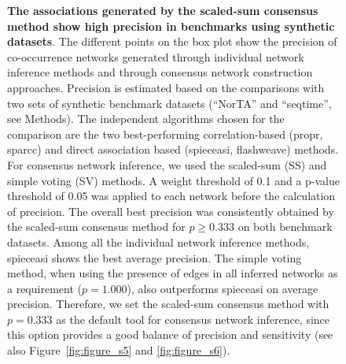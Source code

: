 \documentclass[letterpaper,12pt]{article}
\begin{document}
  \begin{figure}[H]
    \centering
    \caption{
      \textbf{The associations generated by the scaled-sum consensus method show high precision in benchmarks using synthetic datasets}.
    The different points on the box plot show the precision of co-occurrence networks generated through individual network inference methods and through consensus network construction approaches. Precision is estimated based on the comparisons with two sets of synthetic benchmark datasets (``NorTA'' and ``seqtime'', see Methods).
      The independent algorithms chosen for the comparison are the two best-performing correlation-based (propr, sparcc) and direct association based (spieceasi, flashweave) methods.
      For consensus network inference, we used the scaled-sum (SS) and simple voting (SV) methods.
      A weight threshold of 0.1 and a p-value threshold of 0.05 was applied to each network before the calculation of precision.
      The overall best precision was consistently obtained by the scaled-sum consensus method for $p \geq 0.333$ on both benchmark datasets. Among all the individual network inference methods, spieceasi shows the best average precision.
      The simple voting method, when using the presence of edges in all inferred networks as a requirement ($p = 1.000$), also outperforms spieceasi on average precision.
      Therefore, we set the scaled-sum consensus method with $p = 0.333$ as the default tool for consensus network inference, since this option provides a good balance of precision and sensitivity (see also Figure~\ref{fig:figure_s5} and \ref{fig:figure_s6}).
    }
    \label{fig:figure5}
  \end{figure}
\end{document}
